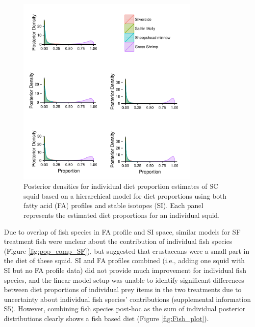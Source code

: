 \documentclass[fleqn,10pt]{wlpeerj}
\begin{document}
\begin{figure}
  \begin{center}
    \includegraphics[width=0.8\textwidth]{figures/Ind_FAP_SC_long.pdf}   
    \caption{Posterior densities for individual diet proportion
      estimates of SC squid based on a hierarchical
      model for diet proportions using both fatty acid (FA) profiles and stable isotopes (SI). Each panel represents the estimated diet proportions for an individual squid.}
    \label{fig:ind_est}
  \end{center}
\end{figure}

Due to overlap of fish species in FA profile and SI space, similar models for
SF treatment fish were unclear about the contribution of individual
fish species (Figure \ref{fig:pop_comp_SF}), but suggested that
crustaceans were a small part in the diet of these squid. SI and FA profiles
combined (i.e., adding one squid with SI but no FA profile data) did not
provide much improvement for individual fish species, and the linear model setup was unable to identify significant differences
between diet proportions of individual prey items in the two
treatments due to uncertainty about individual fish species'
contributions (supplemental information S5). However, combining fish species post-hoc as the sum of individual posterior
distributions clearly shows a fish based diet
(Figure \ref{fig:Fish_plot}). 
\end{document}
